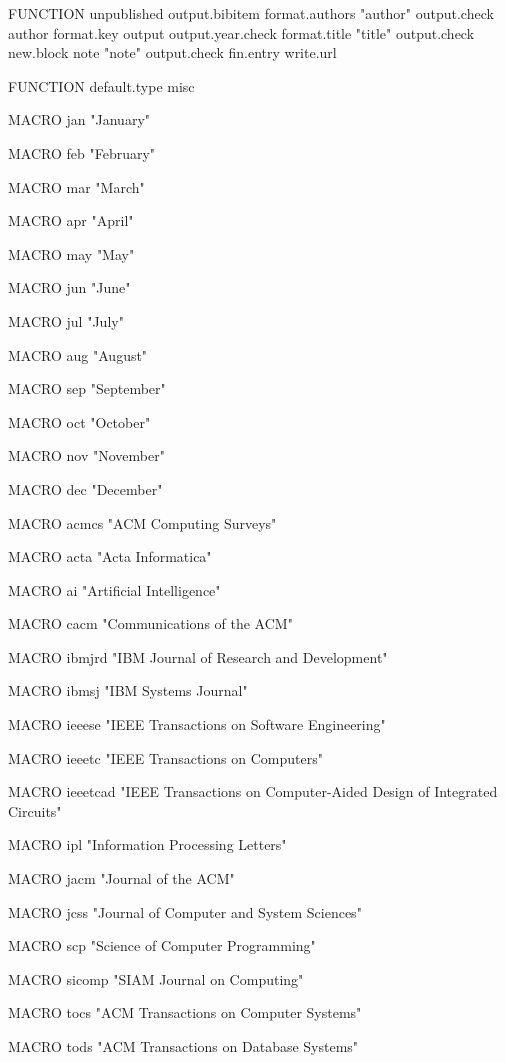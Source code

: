 FUNCTION {unpublished}
{ output.bibitem
  format.authors 
  "author" output.check
  author format.key output              %
  output.year.check                      %
  format.title 
  "title" output.check
  new.block
  note "note" output.check
  fin.entry
  write.url
}

FUNCTION {default.type} { misc }

MACRO {jan} {"January"}

MACRO {feb} {"February"}

MACRO {mar} {"March"}

MACRO {apr} {"April"}

MACRO {may} {"May"}

MACRO {jun} {"June"}

MACRO {jul} {"July"}

MACRO {aug} {"August"}

MACRO {sep} {"September"}

MACRO {oct} {"October"}

MACRO {nov} {"November"}

MACRO {dec} {"December"}

MACRO {acmcs} {"ACM Computing Surveys"}

MACRO {acta} {"Acta Informatica"}

MACRO {ai} {"Artificial Intelligence"}

MACRO {cacm} {"Communications of the ACM"}

MACRO {ibmjrd} {"IBM Journal of Research and Development"}

MACRO {ibmsj} {"IBM Systems Journal"}

MACRO {ieeese} {"IEEE Transactions on Software Engineering"}

MACRO {ieeetc} {"IEEE Transactions on Computers"}

MACRO {ieeetcad}
 {"IEEE Transactions on Computer-Aided Design of Integrated Circuits"}

MACRO {ipl} {"Information Processing Letters"}

MACRO {jacm} {"Journal of the ACM"}

MACRO {jcss} {"Journal of Computer and System Sciences"}

MACRO {scp} {"Science of Computer Programming"}

MACRO {sicomp} {"SIAM Journal on Computing"}

MACRO {tocs} {"ACM Transactions on Computer Systems"}

MACRO {tods} {"ACM Transactions on Database Systems"}


